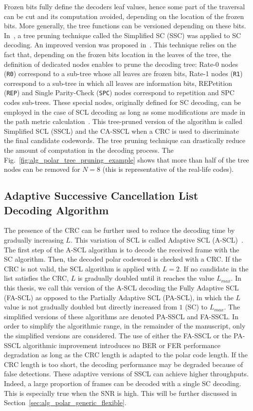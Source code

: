 Frozen bits fully define the decoders leaf values, hence some part of the
traversal can be cut and its computation avoided, depending on the location of
the frozen bits. More generally, the tree functions can be versioned depending
on these bits. In~\cite{Alamdar-Yazdi2011}, a tree pruning technique called the
Simplified SC (SSC) was applied to SC decoding. An improved version was proposed
in~\cite{Sarkis2014a}. This technique relies on the fact that, depending on the
frozen bits location in the leaves of the tree, the definition of dedicated
nodes enables to prune the decoding tree: Rate-0 nodes (\verb|R0|) correspond to
a sub-tree whose all leaves are frozen bits, Rate-1 nodes (\verb|R1|) correspond
to a sub-tree in which all leaves are information bits, REPetition (\verb|REP|)
and Single Parity-Check (\verb|SPC|) nodes correspond to repetition and SPC
codes sub-trees. These special nodes, originally defined for SC decoding, can be
employed in the case of SCL decoding as long as some modifications are made in
the path metric calculation~\cite{Sarkis2016}. This tree-pruned version of the
algorithm is called Simplified SCL (SSCL) and the CA-SSCL when a CRC is used to
discriminate the final candidate codewords. The tree pruning technique can
drastically reduce the amount of computation in the decoding process. The
Fig.~\ref{fig:alg_polar_tree_pruning_example} shows that more than half of the
tree nodes can be removed for $N = 8$ (this is representative of the real-life
codes).

\subsection{Adaptive Successive Cancellation List Decoding Algorithm}

The presence of the CRC can be further used to reduce the decoding time by
gradually increasing $L$. This variation of SCL is called Adaptive SCL
(A-SCL)~\cite{Li2012}. The first step of the A-SCL algorithm is to decode the
received frame with the SC algorithm. Then, the decoded polar codeword is
checked with a CRC. If the CRC is not valid, the SCL algorithm is applied with
$L=2$. If no candidate in the list satisfies the CRC, $L$ is gradually doubled
until it reaches the value $L_{max}$. In this thesis, we call this version of
the A-SCL decoding the Fully Adaptive SCL (FA-SCL) as opposed to the Partially
Adaptive SCL (PA-SCL), in which the $L$ value is not gradually doubled but
directly increased from $1$ (SC) to $L_{max}$. The simplified versions of these
algorithms are denoted PA-SSCL and FA-SSCL. In order to simplify the algorithmic
range, in the remainder of the manuscript, only the simplified versions are
considered. The use of either the FA-SSCL or the PA-SSCL algorithmic improvement
introduces no BER or FER performance degradation as long as the CRC length is
adapted to the polar code length. If the CRC length is too short, the decoding
performance may be degraded because of false detections. These adaptive versions
of SSCL can achieve higher throughputs. Indeed, a large proportion of frames can
be decoded with a single SC decoding. This is especially true when the SNR is
high. This will be further discussed in
Section~\ref{sec:alg_polar_generic_flexible}.


